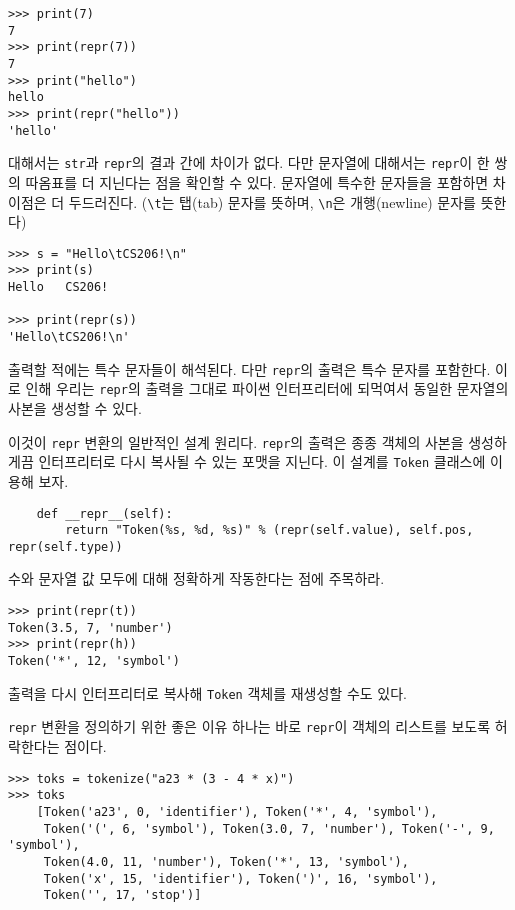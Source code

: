 \documentclass[a4paper]{oblivoir}
\begin{document}
\begin{lstlisting}
>>> print(7)
7
>>> print(repr(7))
7
>>> print("hello")
hello
>>> print(repr("hello"))
'hello'
\end{lstlisting}

 대해서는 \texttt{str}과 \texttt{repr}의 결과 간에 차이가 없다. 다만 문자열에 대해서는 \texttt{repr}이 한 쌍의 따옴표를 더 지닌다는 점을 확인할 수 있다. 문자열에 특수한 문자들을 포함하면 차이점은 더 두드러진다. (\texttt{\textbackslash t}는 탭(tab) 문자를 뜻하며, \texttt{\textbackslash n}은 개행(newline) 문자를 뜻한다)

\begin{lstlisting}
>>> s = "Hello\tCS206!\n"
>>> print(s)
Hello   CS206!

>>> print(repr(s))
'Hello\tCS206!\n'
\end{lstlisting}

 출력할 적에는 특수 문자들이 해석된다. 다만 \texttt{repr}의 출력은 특수 문자를 포함한다. 이로 인해 우리는 \texttt{repr}의 출력을 그대로 파이썬 인터프리터에 되먹여서 동일한 문자열의 사본을 생성할 수 있다.

이것이 \texttt{repr} 변환의 일반적인 설계 원리다. \texttt{repr}의 출력은 종종 객체의 사본을 생성하게끔 인터프리터로 다시 복사될 수 있는 포맷을 지닌다. 이 설계를 \texttt{Token} 클래스에 이용해 보자.

\begin{verbatim}
    def __repr__(self):
        return "Token(%s, %d, %s)" % (repr(self.value), self.pos, repr(self.type))
\end{verbatim}

 수와 문자열 값 모두에 대해 정확하게 작동한다는 점에 주목하라.

\begin{lstlisting}
>>> print(repr(t))
Token(3.5, 7, 'number')
>>> print(repr(h))
Token('*', 12, 'symbol')
\end{lstlisting}

 출력을 다시 인터프리터로 복사해 \texttt{Token} 객체를 재생성할 수도 있다.

\texttt{repr} 변환을 정의하기 위한 좋은 이유 하나는 바로 \texttt{repr}이 객체의 리스트를 보도록 허락한다는 점이다.

\begin{lstlisting}
>>> toks = tokenize("a23 * (3 - 4 * x)")
>>> toks
    [Token('a23', 0, 'identifier'), Token('*', 4, 'symbol'),
     Token('(', 6, 'symbol'), Token(3.0, 7, 'number'), Token('-', 9, 'symbol'),
     Token(4.0, 11, 'number'), Token('*', 13, 'symbol'),
     Token('x', 15, 'identifier'), Token(')', 16, 'symbol'),
     Token('', 17, 'stop')]
\end{lstlisting}
\end{document}
